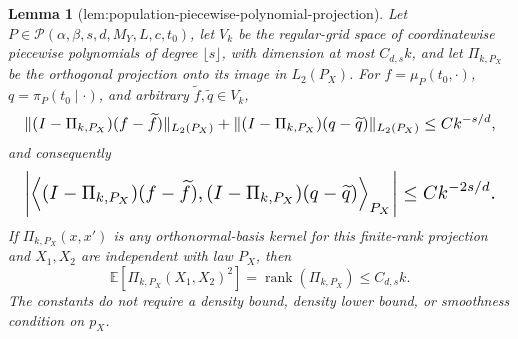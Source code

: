 \documentclass{article}
\newtheorem{lemma}{Lemma}
\begin{document}
\begin{lemma}[lem:population-piecewise-polynomial-projection]\label{lem:population-piecewise-polynomial-projection}
Let \(P\in\mathcal P(\alpha,\beta,s,d,M_Y,L,c,t_0)\), let \(V_k\) be the regular-grid space of coordinatewise piecewise polynomials of degree \(\lfloor s\rfloor\), with dimension at most \(C_{d,s}k\), and let \(\Pi_{k,P_X}\) be the orthogonal projection onto its image in \(L_2(P_X)\). For \(f=\mu_P(t_0,\cdot)\), \(q=\pi_P(t_0\mid\cdot)\), and arbitrary \(\widetilde f,\widetilde q\in V_k\),
\[
\makebox[\linewidth][c]{\resizebox{0.98\linewidth}{!}{\(\displaystyle \lVert(I-\Pi_{k,P_X})(f-\widetilde f)\rVert_{L_2(P_X)}
+\lVert(I-\Pi_{k,P_X})(q-\widetilde q)\rVert_{L_2(P_X)}
\le Ck^{-s/d},\)}}
\]
and consequently
\[
\makebox[\linewidth][c]{\resizebox{0.98\linewidth}{!}{\(\displaystyle \left\lvert\left\langle(I-\Pi_{k,P_X})(f-\widetilde f),(I-\Pi_{k,P_X})(q-\widetilde q)\right\rangle_{P_X}\right\rvert
\le Ck^{-2s/d}.\)}}
\]
If \(\Pi_{k,P_X}(x,x')\) is any orthonormal-basis kernel for this finite-rank projection and \(X_1,X_2\) are independent with law \(P_X\), then
\[
\mathbb E[\Pi_{k,P_X}(X_1,X_2)^2]=\operatorname{rank}(\Pi_{k,P_X})\le C_{d,s}k.
\]
The constants do not require a density bound, density lower bound, or smoothness condition on \(p_X\).
\end{lemma}
\end{document}
